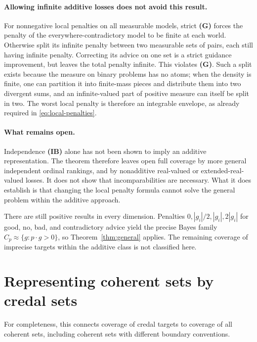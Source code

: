 \documentclass[11pt]{article}
\theoremstyle{remark}
\begin{document}
\paragraph{Allowing infinite additive losses does not avoid this result.}
For nonnegative local penalties on all measurable models, strict
\textbf{(G)} forces the penalty of the everywhere-contradictory model to be
finite at each world. Otherwise split its infinite penalty between two
measurable sets of pairs, each still having infinite penalty. Correcting its
advice on one set is a strict guidance improvement, but leaves the total
penalty infinite. This violates \textbf{(G)}. Such a split exists because
the measure on binary problems has no atoms; when the density is finite,
one can partition it into finite-mass pieces and distribute them into two
divergent sums, and an infinite-valued part of positive measure can itself
be split in two. The worst local penalty is therefore an integrable envelope,
as already required in \eqref{eq:local-penalties}.

\paragraph{What remains open.}
Independence \textbf{(IB)} alone has not been shown to imply an additive
representation. The theorem therefore leaves open full coverage by more
general independent ordinal rankings, and by nonadditive real-valued or
extended-real-valued losses. It does not show that incomparabilities are
necessary. What it does establish is that changing the local penalty formula
cannot solve the general problem within the additive approach.

There are still positive results in every dimension. Penalties
$0,|g_i|/2,|g_i|,2|g_i|$ for good, no, bad, and contradictory advice yield
the precise Bayes family $C_p\approx\{g:p\cdot g>0\}$, so
Theorem~\ref{thm:general} applies. The remaining coverage of imprecise targets
within the additive class is not classified here.

\appendix
\section{Representing coherent sets by credal sets}\label{app:representation}

For completeness, this connects coverage of credal targets to coverage of all
coherent sets, including coherent sets with different boundary conventions.
\end{document}

